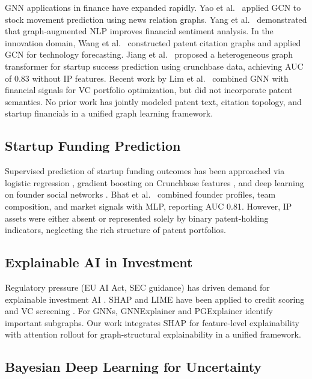 \documentclass[journal]{IEEEtran}
\begin{document}
GNN applications in finance have expanded rapidly. Yao et al.~\cite{yao2020graph} applied GCN to stock movement prediction using news relation graphs. Yang et al.~\cite{yang2020finbert} demonstrated that graph-augmented NLP improves financial sentiment analysis. In the innovation domain, Wang et al.~\cite{wang2021patent} constructed patent citation graphs and applied GCN for technology forecasting. Jiang et al.~\cite{jiang2022heterogeneous} proposed a heterogeneous graph transformer for startup success prediction using crunchbase data, achieving AUC of 0.83 without IP features. Recent work by Lim et al.~\cite{lim2023graph} combined GNN with financial signals for VC portfolio optimization, but did not incorporate patent semantics. No prior work has jointly modeled patent text, citation topology, and startup financials in a unified graph learning framework.

\subsection{Startup Funding Prediction}

Supervised prediction of startup funding outcomes has been approached via logistic regression \cite{baird2020startup}, gradient boosting on Crunchbase features \cite{yankov2020predicting}, and deep learning on founder social networks \cite{krishna2022predicting}. Bhat et al.~\cite{bhat2022multimodal} combined founder profiles, team composition, and market signals with MLP, reporting AUC 0.81. However, IP assets were either absent or represented solely by binary patent-holding indicators, neglecting the rich structure of patent portfolios.

\subsection{Explainable AI in Investment}

Regulatory pressure (EU AI Act, SEC guidance) has driven demand for explainable investment AI \cite{eiopa2021xai}. SHAP \cite{lundberg2017unified} and LIME \cite{ribeiro2016lime} have been applied to credit scoring and VC screening \cite{cao2020xai_finance}. For GNNs, GNNExplainer \cite{ying2019gnnexplainer} and PGExplainer \cite{luo2020parameterized} identify important subgraphs. Our work integrates SHAP for feature-level explainability with attention rollout \cite{abnar2020quantifying} for graph-structural explainability in a unified framework.

\subsection{Bayesian Deep Learning for Uncertainty}
\end{document}
